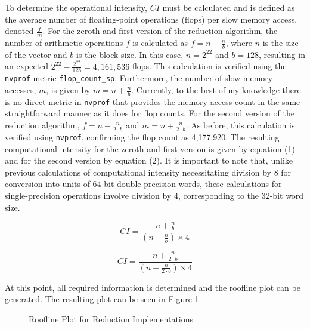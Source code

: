 \documentclass{article}
\begin{document}
\bigskip
\noindent
To determine the operational intensity, \(CI\) must be calculated and is defined as the average number of floating-point operations (flops) per slow memory access, denoted \(\frac{f}{m}\). For the zeroth and first version of the reduction algorithm, the number of arithmetic operations \( f \) is calculated as \( f = n - \frac{n}{b} \), where \( n \) is the size of the vector and \( b \) is the block size. In this case, \( n = 2^{22} \) and \( b = 128 \), resulting in an expected \( 2^{22} - \frac{2^{22}}{128} = 4,161,536 \) flops. This calculation is verified using the \texttt{nvprof} metric \texttt{flop\_count\_sp}. Furthermore, the number of slow memory accesses, \( m \), is given by \( m = n + \frac{n}{b} \). Currently, to the best of my knowledge there is no direct metric in \texttt{nvprof} that provides the memory access count in the same straightforward manner as it does for flop counts. For the second version of the reduction algorithm, \( f = n - \frac{n}{2 \cdot b} \) and \( m = n + \frac{n}{2 \cdot b} \). As before, this calculation is verified using \texttt{nvprof}, confirming the flop count as 4,177,920. The resulting computational intensity for the zeroth and first version is given by equation (1) and for the second version by equation (2). It is important to note that, unlike previous calculations of computational intensity necessitating division by 8 for conversion into units of 64-bit double-precision words, these calculations for single-precision operations involve division by 4, corresponding to the 32-bit word size. 

\begin{equation}
CI = \frac{n + \frac{n}{b}}{(n - \frac{n}{b}) \times 4}
\end{equation}

\begin{equation}
CI = \frac{n + \frac{n}{2 \cdot b}}{(n - \frac{n}{2 \cdot b}) \times 4}
\end{equation}

\bigskip
\noindent
At this point, all required information is determined and the roofline plot can be generated. The resulting plot can be seen in Figure 1.

\clearpage

\begin{figure}[!htb]
    \centering
    \caption{Roofline Plot for Reduction Implementations}
\end{figure}
\end{document}
